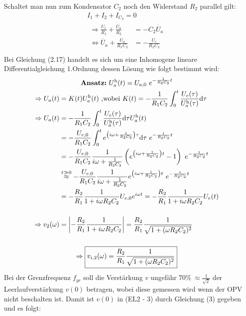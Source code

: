 Schaltet man nun zum Kondensator $C_2$ noch den Widerstand $R_2$ parallel gilt:
\begin{gather}
    I_1 + I_2 + I_{C_2} = 0\\
    \begin{aligned}
        \Rightarrow \frac{U_e}{R_1} + \frac{U_a}{R_2} &= -C_2 \dot{U_a}\\
        \Leftrightarrow \dot{U_a} + \frac{U_a}{R_1 C_2} &= -\frac{U_e}{R_2 C_2}\\
    \end{aligned}
\end{gather}
Bei Gleichung (2.17) handelt es sich um eine Inhomogene lineare Differentialgleichung 1.Ordnung dessen Lösung wie folgt bestimmt wird:
\begin{gather}
    \text{\textbf{Ansatz:}}~U_a^\text{h}(t) = U_{a,0}~e^{-\frac{1}{R_2 C_2} t}\\
    \begin{aligned}
        \Rightarrow U_a(t) &= K(t) U_a^\text{h}(t)~\text{,wobei}~K(t) = -\frac{1}{R_1 C_2} \int_0^t\frac{U_e(\tau)}{U_a^\text{h}(\tau)}\text{d}\tau\\
        \Rightarrow U_a(t) &= -\frac{1}{R_1 C_2} \int_0^t \frac{U_e(\tau)}{U_a^\text{h}(\tau)}\text{d}\tau U_a^\text{h}(t)\\
        &= -\frac{U_{e,0}}{R_1 C_2} \int_0^t e^{\left(i\omega + \frac{1}{R_2 C_2}\right) \tau} \text{d}\tau~e^{-\frac{1}{R_2 C_2} t}\\
        &= -\frac{U_{e,0}}{R_1 C_2} \frac{1}{i\omega + \frac{1}{R_2 C_2}} \left(e^{\left(i\omega + \frac{1}{R_2 C_2}\right) t} - 1 \right) ~e^{-\frac{1}{R_2 C_2} t}\\
        &\overset{t \gg 0}{\approx} -\frac{U_{e,0}}{R_1 C_2} \frac{1}{i\omega + \frac{1}{R_2 C_2}} e^{\left(i\omega + \frac{1}{R_2 C_2}\right) t}~e^{-\frac{1}{R_2 C_2} t}\\
        &= - \frac{R_2}{R_1} \frac{1}{1+i\omega R_2 C_2} U_{e,0} e^{i\omega t} = - \frac{R_2}{R_1} \frac{1}{1+i\omega R_2 C_2} U_e(t)\\[0.5cm]
        \Rightarrow v_{2}(\omega) &= \abs{-\frac{R_2}{R_1} \frac{1}{1+i\omega R_2 C_2}} = \frac{R_2}{R_1} \frac{1}{\sqrt{1+(\omega R_2 C_2)^2}}
    \end{aligned}\\[0.5cm]
    \Rightarrow \boxed{v_{i,2}(\omega)=\frac{R_2}{R_1} \frac{1}{\sqrt{1+(\omega R_2 C_2)^2}}}
\end{gather}
Bei der Grenzfrequenz $f_{gr}$ soll die Verstärkung $v$ ungefähr $70\%~\approx\frac{1}{\sqrt{2}}$ der Leerlaufverstärkung $v(0)$ betragen, wobei diese gemessen wird wenn der OPV nicht beschalten ist. Damit ist $v(0)$ in (EL2 - 3) durch Gleichung (3) gegeben und es folgt: %
